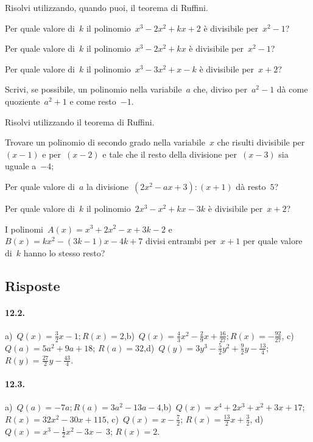 \begin{esercizio}[\Ast]
\label{ese:12.17}
Risolvi utilizzando, quando puoi, il teorema di Ruffini.
 \begin{enumeratea}
 \item Per quale valore di~$k$ il polinomio~$x^{3}-2x^{2}+kx+2$ è divisibile per~$x^{2}-1$?
 \item Per quale valore di~$k$ il polinomio~$x^{3}-2x^{2}+kx$ è divisibile per~$x^{2}-1$?
 \item Per quale valore di~$k$ il polinomio~$x^{3}-3x^{2}+x-k$ è divisibile per~$x+2$?
 \item Scrivi, se possibile, un polinomio nella variabile~$a$ che, diviso per~$a^{2}-1$ dà come quoziente~$a^{2}+1$ e come resto~$-1$.
 \end{enumeratea}
\end{esercizio}

\begin{esercizio}[\Ast]
\label{ese:12.18}
Risolvi utilizzando il teorema di Ruffini.
 \begin{enumeratea}
 \item Trovare un polinomio di secondo grado nella variabile~$x$ che risulti divisibile per~$(x-1)$ e per~$(x-2)$ e tale che
     il resto della divisione per~$(x-3)$ sia uguale a~$-4$;
 \item Per quale valore di~$a$ la divisione~$\left(2x^{2}-ax+3\right):(x+1)$ dà resto~$5$?
 \item Per quale valore di~$k$ il polinomio~$2x^{3}-x^{2}+kx-3k$ è divisibile per~$x+2$?
 \item I polinomi~$A(x)=x^3+2x^2-x+3k-2$ e~$B(x)=kx^2-(3k-1)x-4k+7$ divisi entrambi per~$x+1$ per quale valore di~$k$ hanno lo stesso resto?
 \end{enumeratea}
\end{esercizio}

\subsection{Risposte}
\paragraph{12.2.}
a)~$Q(x)=\frac{3}{2}x-1; R(x)=2$,\quad b)~$Q(x)=\frac{4}{3}x^{2}-\frac{2}{9}x+\frac{16}{27}; R(x)=-{\frac{92}{27}}$,\quad
c)~{$Q(a)=5a^{2}+9a+18$}; $R(a)=32$,\quad d)~$Q(y)=3y^{3}-\frac{5}{2}y^{2}+\frac{9}{2}y-\frac{13}{4}$; $R(y)=\frac{27}{2}y-\frac{43}{4}$.
\paragraph{12.3.}
a)~$Q(a)=-7a; R(a)=3a^{2}-13a-4$,\quad b)~$Q(x)=x^{4}+2x^{3}+x^{2}+3x+17$;\protect\\ ${R(x)=32x^{2}-30x+115}$,\quad
c)~$Q(x)=x-\frac{7}{2}$; $R(x)=\frac{13}{2}x+\frac{3}{2}$, d)~$Q(x)=x^{3}-\frac{1}{2}x^{2}-3x-~3$; $R(x)=2$.
